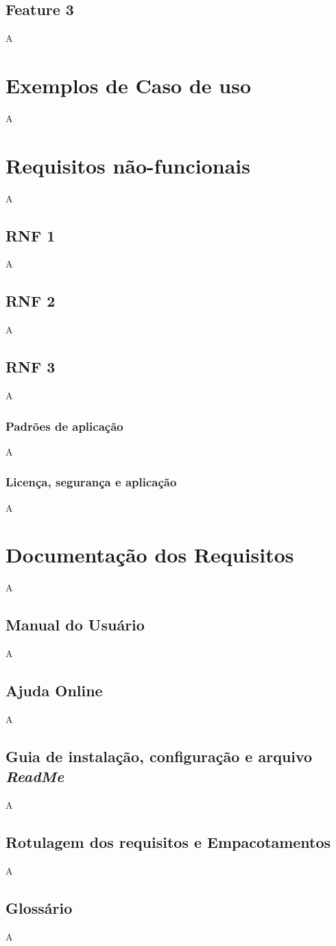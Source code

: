 \begin{apendicesenv}
		\subsection{Feature 3}
A

	\section{Exemplos de Caso de uso}
A
	\section{Requisitos não-funcionais}		
A
		\subsection{RNF 1}
A
		\subsection{RNF 2}
A
		\subsection{RNF 3}
A
			\subsubsection{Padrões de aplicação}
A
			\subsubsection{Licença, segurança e aplicação}
A

	\section{Documentação dos Requisitos}
A
		\subsection{Manual do Usuário}
A
		\subsection{Ajuda Online}
A
		\subsection{Guia de instalação, configuração e arquivo \textit{ReadMe}}
A
		\subsection{Rotulagem dos requisitos e Empacotamentos}
A
		\subsection{Glossário}
A


\end{apendicesenv}
